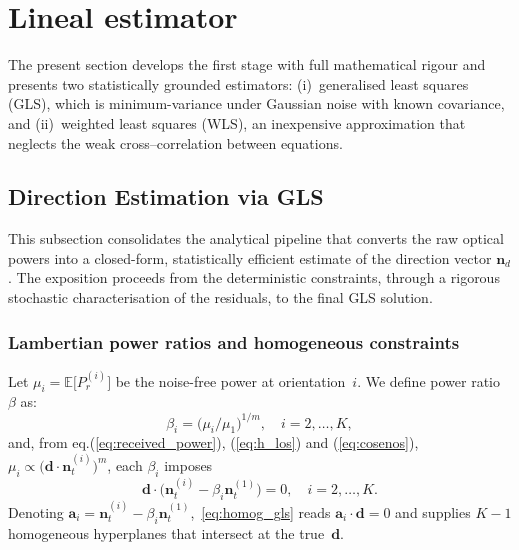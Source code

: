 \documentclass[lettersize,journal]{IEEEtran}
\begin{document}
\section{Lineal estimator}
\label{sec:Lineal}

The present section develops the first stage with full mathematical
rigour and presents two statistically grounded estimators:
(i)~generalised least squares (GLS), which is minimum-variance under
Gaussian noise with known covariance, and
(ii)~weighted least squares (WLS), an inexpensive
approximation that neglects the weak cross–correlation between
equations.



\subsection{Direction Estimation via GLS}
\label{subsec:gls_direction}

This subsection consolidates the analytical pipeline that converts the raw optical powers into a closed-form, statistically efficient estimate of the direction vector $\mathbf{n}_d$. The exposition proceeds from the determin\-istic constraints, through a rigorous stochastic characterisation of the residuals, to the final GLS solution.

\subsubsection{Lambertian power ratios and homogeneous constraints}
Let $\mu_i=\mathbb E\!\bigl[P_r^{(i)}\bigr]$ be the noise-free power at
orientation~$i$. We define power ratio $\beta$ as:
\begin{equation}
  \beta_i=\bigl(\mu_i/\mu_1\bigr)^{1/m}, \quad i=2,\ldots,K,
  \label{eq:beta_def_gls}
\end{equation}
and, from eq.(\ref{eq:received_power}), (\ref{eq:h_los}) and (\ref{eq:cosenos}), 
$\mu_i\!\propto\!\bigl(\mathbf d\cdot\mathbf n_t^{(i)}\bigr)^{m}$,
each $\beta_i$ imposes
\begin{equation}
  \mathbf d \cdot
  \bigl(\mathbf n_t^{(i)}-\beta_i\mathbf n_t^{(1)}\bigr)=0,
  \quad
  i=2,\ldots,K.
  \label{eq:homog_gls}
\end{equation}
Denoting
$\mathbf a_i\!=\!
 \mathbf n_t^{(i)}-\beta_i\mathbf n_t^{(1)}$,~\eqref{eq:homog_gls}
reads $\mathbf a_i\cdot\mathbf d=0$ and supplies $K-1$ homogeneous hyperplanes that intersect at the true~$\mathbf d$.
\end{document}
